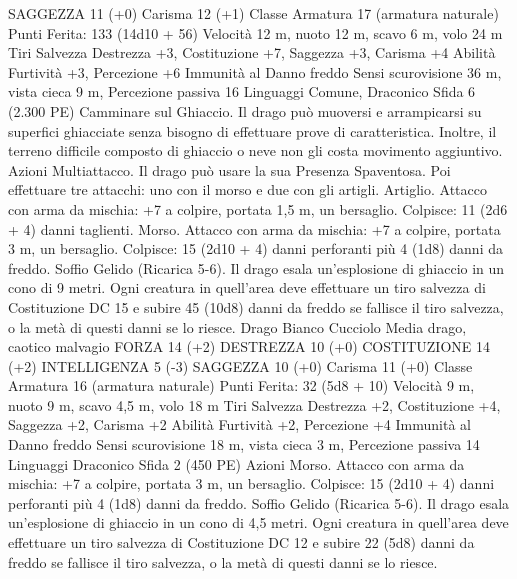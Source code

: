 \begin{multicols}{2}
SAGGEZZA 11 (+0)
Carisma 12 (+1)
Classe Armatura 17 (armatura naturale)
\hspace*{0pt}\hfill{Punti Ferita}: 133 (14d10 + 56)
Velocità 12 m, nuoto 12 m, scavo 6 m, volo 24 m
Tiri Salvezza Destrezza +3, Costituzione +7, Saggezza +3,
Carisma +4
Abilità Furtività +3, Percezione +6
Immunità al Danno freddo
Sensi scurovisione 36 m, vista cieca 9 m, Percezione passiva 16
Linguaggi Comune, Draconico
Sfida 6 (2.300 PE)
Camminare sul Ghiaccio. Il drago può muoversi e arrampicarsi su
superfici ghiacciate senza bisogno di effettuare prove di
caratteristica. Inoltre, il terreno difficile composto di ghiaccio o neve
non gli costa movimento aggiuntivo.
Azioni
Multiattacco. Il drago può usare la sua Presenza Spaventosa. Poi
effettuare tre attacchi: uno con il morso e due con gli artigli.
Artiglio. Attacco con arma da mischia: +7 a colpire, portata 1,5
m, un bersaglio.
Colpisce: 11 (2d6 + 4) danni taglienti.
Morso. Attacco con arma da mischia: +7 a colpire, portata 3 m,
un bersaglio.
Colpisce: 15 (2d10 + 4) danni perforanti più 4 (1d8) danni da freddo.
Soffio Gelido (Ricarica 5-6). Il drago esala un’esplosione di ghiaccio
in un cono di 9 metri. Ogni creatura in quell’area deve effettuare un tiro
salvezza di Costituzione DC 15 e subire 45 (10d8) danni da freddo se
fallisce il tiro salvezza, o la metà di questi danni se lo riesce.
Drago Bianco Cucciolo
Media drago, caotico malvagio
FORZA 14 (+2)
DESTREZZA 10 (+0)
COSTITUZIONE 14 (+2)
INTELLIGENZA 5 (-3)
SAGGEZZA 10 (+0)
Carisma 11 (+0)
Classe Armatura 16 (armatura naturale)
\hspace*{0pt}\hfill{Punti Ferita}: 32 (5d8 + 10)
Velocità 9 m, nuoto 9 m, scavo 4,5 m, volo 18 m
Tiri Salvezza Destrezza +2, Costituzione +4, Saggezza +2,
Carisma +2
Abilità Furtività +2, Percezione +4
Immunità al Danno freddo
Sensi scurovisione 18 m, vista cieca 3 m, Percezione passiva 14
Linguaggi Draconico
Sfida 2 (450 PE)
Azioni
Morso. Attacco con arma da mischia: +7 a colpire, portata 3 m,
un bersaglio.
Colpisce: 15 (2d10 + 4) danni perforanti più 4 (1d8) danni da freddo.
Soffio Gelido (Ricarica 5-6). Il drago esala un’esplosione di ghiaccio
in un cono di 4,5 metri. Ogni creatura in quell’area deve effettuare un
tiro salvezza di Costituzione DC 12 e subire 22 (5d8) danni da freddo
se fallisce il tiro salvezza, o la metà di questi danni se lo riesce.
 

\end{multicols}
